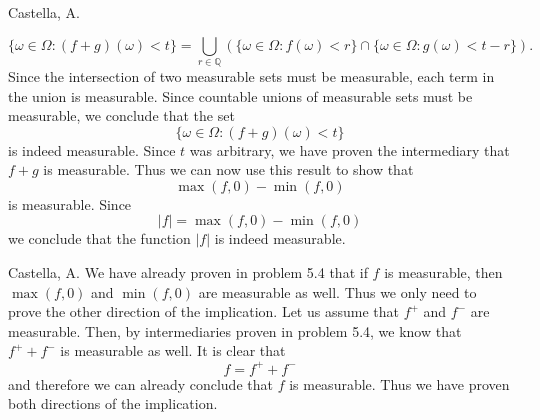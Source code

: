 \begin{solution}[5.4]{Castella, A.}
\begin{itemize}
        $$
            \{\omega \in \Omega : (f+g)(\omega) < t\} = \bigcup_{r\in\mathbb{Q}}\left(\{\omega \in \Omega : f(\omega) < r\}\cap \{\omega \in \Omega : g(\omega) < t-r\}\right).
        $$
        Since the intersection of two measurable sets must be measurable, each term in the union is measurable. Since countable unions of measurable sets must be measurable, we conclude that the set
        $$
            \{\omega \in \Omega : (f+g)(\omega) < t\}
        $$
        is indeed measurable. Since $t$ was arbitrary, we have proven the intermediary that $f+g$ is measurable. Thus we can now use this result to show that
        $$
            \max(f,0) - \min(f,0)
        $$
        is measurable. Since
        $$
            |f| = \max(f,0) - \min(f,0)
        $$
        we conclude that the function $|f|$ is indeed measurable.
    \end{itemize}
\end{solution}

\begin{solution}[5.14]{Castella, A.}
    We have already proven in problem 5.4 that if $f$ is measurable, then $\max(f,0)$ and $\min(f,0)$ are measurable as well. Thus we only need to prove the other direction of the implication. Let us assume that $f^+$ and $f^-$ are measurable. Then, by intermediaries proven in problem 5.4, we know that $f^+ + f^-$ is measurable as well. It is clear that
    $$
        f = f^+ + f^-
    $$
    and therefore we can already conclude that $f$ is measurable. Thus we have proven both directions of the implication. 
\end{solution}